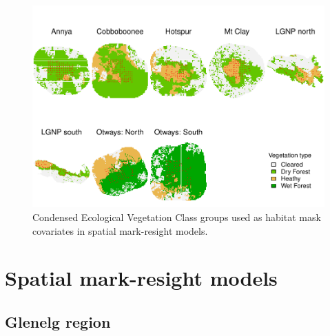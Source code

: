 \documentclass[11pt,a4paper,titlepage,twoside,openright]{style/unimelbthesis}
\begin{document}
\begin{mainmatter}
\newpage

\(~\)

\(~\)

\(~\)
\begin{figure}

{\centering \includegraphics[width=1\linewidth]{figure/density-veg-1} 

}

\caption{Condensed Ecological Vegetation Class groups used as habitat mask covariates in spatial mark-resight models.}\label{fig:density-veg}
\end{figure}
\newpage

\hypertarget{spatial-mark-resight-models}{%
\section{Spatial mark-resight models}\label{spatial-mark-resight-models}}

\hypertarget{glenelg-region-2}{%
\subsection{Glenelg region}\label{glenelg-region-2}}

\(~\)

\(~\)

\(~\)


\end{mainmatter}
\end{document}
